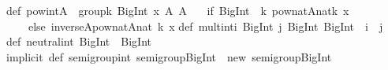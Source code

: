 \begin{isabellebody}
\begin{isamarkuptext}
{}\isanewline
\isanewline
def\ pow{}int{}A\ {}\ group{}{}k{}\ BigInt{}\ x{}\ A{}{}\ A\ {}\isanewline
\ \ {}if\ {}BigInt{}{}{}\ {}{}\ k{}\ pow{}nat{}A{}{}nat{}k{}{}\ x{}\isanewline
\ \ \ \ else\ inverse{}A{}{}pow{}nat{}A{}{}nat{}{}{}\ k{}{}{}\ x{}{}{}\isanewline
\isanewline
def\ mult{}int{}i{}\ BigInt{}\ j{}\ BigInt{}{}\ BigInt\ {}\ i\ {}\ j\isanewline
\isanewline
def\ neutral{}int{}\ BigInt\ {}\ BigInt{}{}{}\isanewline
\isanewline
implicit\ def\ semigroup{}int{}\ semigroup{}BigInt{}\ {}\ new\ semigroup{}BigInt{}\ {}\isanewline

\end{isamarkuptext}
\end{isabellebody}
